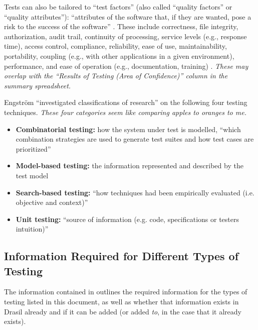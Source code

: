 Tests can also be tailored to ``test factors'' (also called ``quality factors''
or ``quality attributes''): ``attributes of the software that, if they are
wanted, pose a risk to the success of the software''
\citep[p.~40]{Perry2006}. These include correctness, file integrity,
authorization, audit trail, continuity of processing, service levels
(e.g., response time), access control, compliance, reliability, ease of use,
maintainability, portability, coupling (e.g., with other applications in a
given environment), performance, and ease of operation (e.g., documentation,
training) \citep[pp.~40-41]{Perry2006}. \emph{These may overlap with
      the ``Results of Testing (Area of Confidence)'' column in the summary
      spreadsheet.}

Engström ``investigated classifications of research''
\citep[p.~1]{engström_mapping_2015} on the following four testing techniques.
\emph{These four categories seem like comparing apples to oranges to me.}

\begin{itemize}
      \item \textbf{Combinatorial testing:} how the system under test is
            modelled, ``which combination strategies are used to generate test
            suites and how test cases are prioritized''
            \citep[pp.~1-2]{engström_mapping_2015}
      \item \textbf{Model-based testing:} the information represented and
            described by the test model \citep[p.~2]{engström_mapping_2015}
      \item \textbf{Search-based testing:} ``how techniques had been
            empirically evaluated (i.e. objective and context)''
            \citep[p.~2]{engström_mapping_2015}
      \item \textbf{Unit testing:} ``source of information (e.g. code,
            specifications or testers intuition)''
            \citep[p.~2]{engström_mapping_2015}
\end{itemize}

\subsection{Information Required for Different Types of Testing}

The information contained in  outlines the required
information for the types of testing listed in this document, as well as
whether that information exists in Drasil already and if it can be added
(or added \emph{to}, in the case that it already exists).

